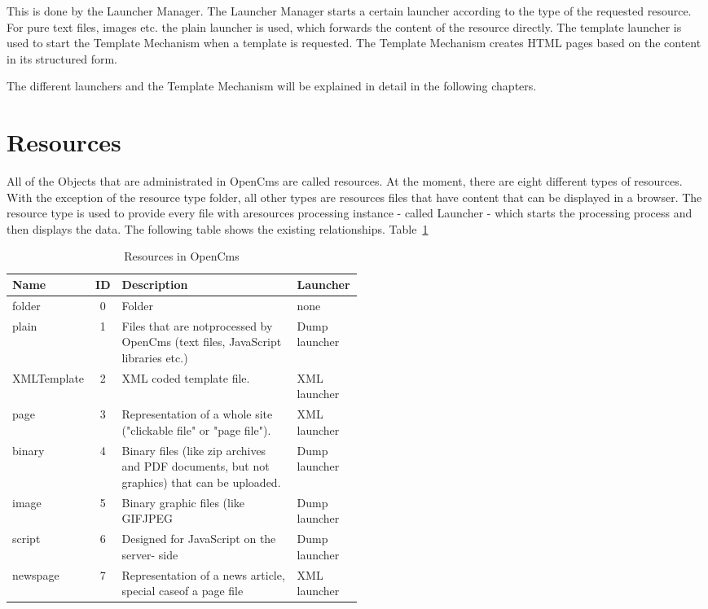This is done by the {\name Launcher Manager}. The {\name Launcher Manager} starts a
certain launcher according to the type of the requested resource. For
pure text files, images etc. the plain launcher is used, which forwards
the content of the resource directly. The {\name template launcher} is used to
start the Template Mechanism when a template is requested. The {\name Template
Mechanism} creates HTML pages based on the content in its structured form.

The different launchers and the {\name Template Mechanism} will be explained in
detail in the following chapters.
\newpage

\section{Resources}
All of the Objects that are administrated in OpenCms are called
{\name resources}. At the moment, there are eight different types of
resources. With the exception of the resource type {\name folder,} all other
types are resources files that have content that can be displayed in a
browser. The  resource type is used to provide every file with aresources
processing instance - called {\name Launcher} - which starts the processing
process and then displays the data. The following table shows the
existing relationships. {Table~\ref {resources}}
\begin{table}[h]
\begin{center}
\begin{tabular}{|l|c|p{0.50\linewidth}|l|}
\hline
{\bf Name}& 
{\bf ID}& 
{\bf Description}& 
{\bf Launcher}\\ \hline
folder&
0& Folder&none\\ \hline
plain&
1&
Files that are notprocessed by OpenCms (text files, JavaScript libraries etc.)&
Dump launcher\\ \hline
XMLTemplate&
2&
XML coded template file.&
XML launcher\\ \hline
page&
3&
Representation of a whole site ("clickable file" or "page file").&
XML launcher\\ \hline
binary&
4& 
Binary files (like zip archives and PDF documents, but not graphics) that can be uploaded.&
Dump launcher\\ \hline
image& 
5& 
Binary graphic files (like  GIFJPEG& 
Dump launcher\\ \hline
script& 
6& 
Designed for JavaScript on the server- side& 
Dump launcher\\ \hline
newspage&
7& 
Representation of a news article, special caseof a page file& 
XML launcher\\ \hline 
\end{tabular}
\caption [Resources in OpenCms]{Resources in OpenCms}
\end{center}
\label{resources}
\end{table}

